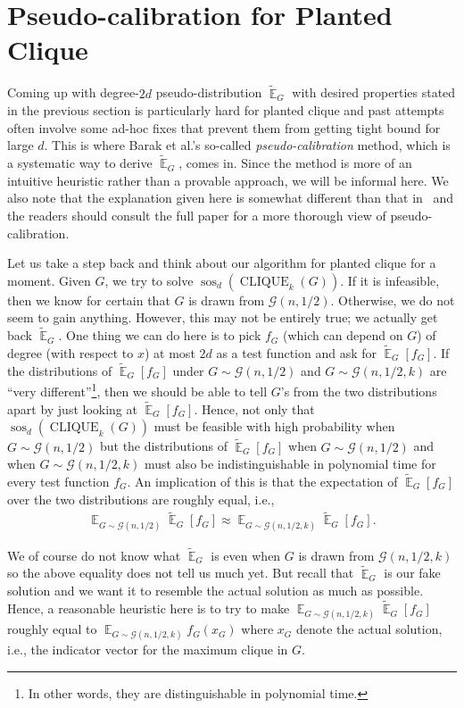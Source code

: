 \documentclass{article}[11pt]
\DeclareMathOperator{\sos}{sos}
\DeclareMathOperator{\cli}{CLIQUE}
\newcommand{\cG}{\mathcal{G}}
\newcommand{\E}{\mathop{\mathbb{E}}}
\newcommand{\tE}{\tilde{\E}}
\newcounter{section-preserve}
\begin{document}
\section{Pseudo-calibration for Planted Clique}

Coming up with degree-$2d$ pseudo-distribution $\tE_G$ with desired properties stated in the previous section is particularly hard for planted clique and past attempts often involve some ad-hoc fixes that prevent them from getting tight bound for large $d$. This is where Barak et al.'s so-called \emph{pseudo-calibration} method, which is a systematic way to derive $\tE_G$, comes in.
Since the method is more of an intuitive heuristic rather than a provable approach, we will be informal here.
We also note that the explanation given here is somewhat different than that in~\cite{BHKKMP16} and the readers should consult the full paper for a more thorough view of pseudo-calibration.

Let us take a step back and think about our algorithm for planted clique for a moment. Given $G$, we try to solve $\sos_d(\cli_k(G))$. If it is infeasible, then we know for certain that $G$ is drawn from $\cG(n, 1/2)$. Otherwise, we do not seem to gain anything. However, this may not be entirely true; we actually get back $\tE_G$. One thing we can do here is to pick $f_G$ (which can depend on $G$) of degree (with respect to $x$) at most $2d$ as a test function and ask for $\tE_G[f_G]$. If the distributions of $\tE_G[f_G]$ under $G \sim \cG(n, 1/2)$ and $G \sim \cG(n, 1/2, k)$ are ``very different''\footnote{In other words, they are distinguishable in polynomial time.}, then we should be able to tell $G$'s from the two distributions apart by just looking at $\tE_G[f_G]$. Hence, not only that $\sos_d(\cli_k(G))$ must be feasible with high probability when $G \sim \cG(n, 1/2)$ but the distributions of $\tE_G[f_G]$ when $G \sim \cG(n, 1/2)$ and when $G \sim \cG(n, 1/2, k)$ must also be indistinguishable in polynomial time for every test function $f_G$. An implication of this is that the expectation of $\tE_G[f_G]$ over the two distributions are roughly equal, i.e.,
\begin{align*}
\E_{G \sim \cG(n, 1/2)} \tE_G[f_G] \approx \E_{G \sim \cG(n, 1/2, k)} \tE_G[f_G].
\end{align*}

We of course do not know what $\tE_G$ is even when $G$ is drawn from $\cG(n, 1/2, k)$ so the above equality does not tell us much yet. But recall that $\tE_G$ is our fake solution and we want it to resemble the actual solution as much as possible. Hence, a reasonable heuristic here is to try to make $\E_{G \sim \cG(n, 1/2, k)} \tE_G[f_G]$ roughly equal to $\E_{G \sim \cG(n, 1/2, k)} f_G(x_G)$ where $x_G$ denote the actual solution, i.e., the indicator vector for the maximum clique in $G$.
\end{document}

